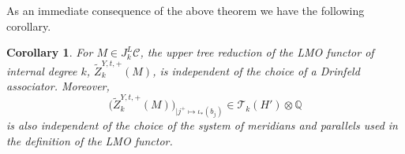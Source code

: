 \documentclass[10pt]{amsart}
\numberwithin{equation}{section}
\numberwithin{equation}{section}
\newtheorem{corollary}[theorem]{Corollary}
\theoremstyle{definition}
\begin{document}
As an immediate consequence of the above theorem we have the following corollary.

\begin{corollary} For $M\in J_k^L\mathcal{C}$, the upper tree reduction of the LMO functor of internal degree $k$, $\widetilde{Z}_k^{Y,t,+}(M)$, is independent of the choice of a Drinfeld associator. Moreover,
$$\big(\widetilde{Z}_k^{Y,t,+}(M)\big)_{|j^+\mapsto \iota_*(b_j)}\in \mathcal{T}_k(H')\otimes\mathbb{Q}$$
 is also independent of the choice of the system of meridians and parallels used in the definition of the LMO functor.
\end{corollary}







 
\end{document}
